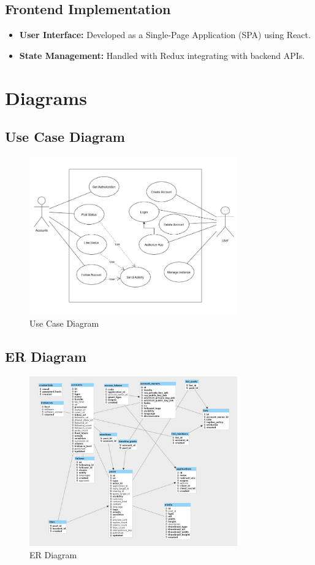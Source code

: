\subsection{Frontend Implementation}
\begin{itemize}
    \item \textbf{User Interface:} Developed as a Single-Page Application (SPA) using React.
    \item \textbf{State Management:} Handled with Redux integrating with backend APIs.
\end{itemize}

\section{Diagrams}
\subsection{Use Case Diagram}
\begin{figure}[h!]
    \centering
    \includegraphics[width=0.8\textwidth]{Graphics/usecasediagram.png}
    \caption{Use Case Diagram}
\end{figure}

\clearpage

\subsection{ER Diagram}
\begin{figure}[h!]
    \centering
    \includegraphics[width=0.8\textwidth]{Graphics/erdiagram.png}
    \caption{ER Diagram}
\end{figure}

